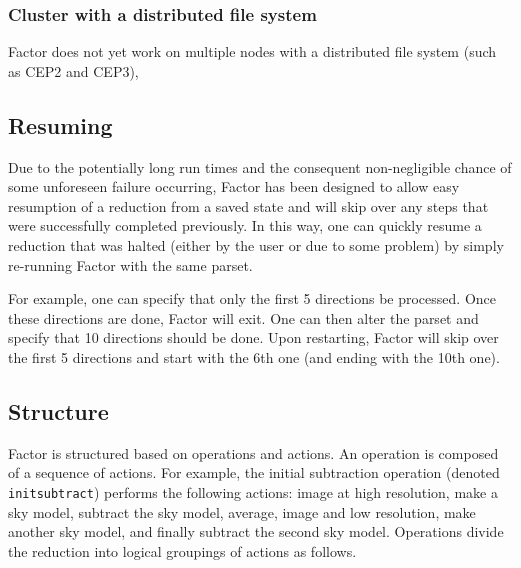 \documentclass[structabstract]{article}
\begin{document}
\subsubsection{Cluster with a distributed file system}
Factor does not yet work on multiple nodes with a distributed file system (such
as CEP2 and CEP3),


\subsection{Resuming}
\label{factor:resuming}

Due to the potentially long run times and the consequent non-negligible chance
of some unforeseen failure occurring, Factor has been designed to allow easy
resumption of a reduction from a saved state and will skip over any steps that
were successfully completed previously. In this way, one can quickly resume a
reduction that was halted (either by the user or due to some problem) by simply
re-running Factor with the same parset.

For example, one can specify that only the first 5 directions be processed.
Once these directions are done, Factor will exit. One can then alter the parset
and specify that 10 directions should be done. Upon restarting, Factor will skip
over the first 5 directions and start with the 6th one (and ending with the 10th
one).


\subsection{Structure}
\label{factor:structure}

Factor is structured based on operations and actions. An operation is composed
of a sequence of actions. For example, the initial subtraction operation
(denoted {\tt initsubtract}) performs the following actions: image at high resolution,
make a sky model, subtract the sky model, average, image and low resolution,
make another sky model, and finally subtract the second sky model. Operations
divide the reduction into logical groupings of actions as follows.
\end{document}
